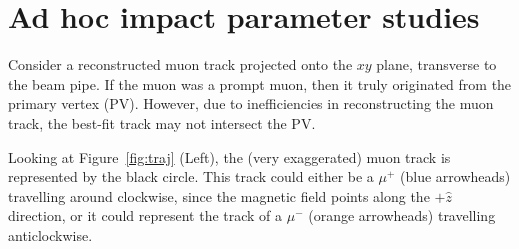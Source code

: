 

% 





\chapter{Ad hoc impact parameter studies}
\label{app:adhoc_studies}


Consider a reconstructed muon track projected onto the $xy$ plane, transverse to the beam pipe.
If the muon was a prompt muon, then it truly originated from the primary vertex (PV).
However, due to inefficiencies in reconstructing the muon track, 
the best-fit track may not intersect the PV. 

Looking at Figure~\ref{fig:traj} (Left), the (very exaggerated) muon track is represented by the black circle.
This track could either be a $\mu^+$ (blue arrowheads) travelling around clockwise, since the magnetic field points along the $+\hat{z}$ direction,
or it could represent the track of a $\mu^-$ (orange arrowheads) travelling anticlockwise.

